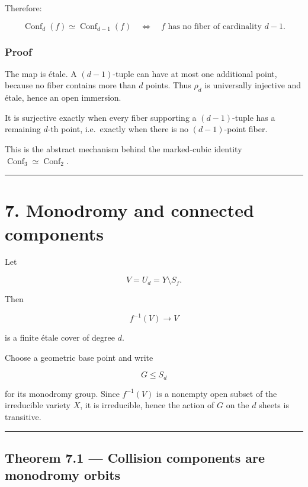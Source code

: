 Therefore:

\[
\boxed{
\operatorname{Conf}_d(f)\simeq \operatorname{Conf}_{d-1}(f)
\quad\Longleftrightarrow\quad
f\text{ has no fiber of cardinality }d-1.
}
\]

\subsubsection{Proof}\label{proof-5}

The map is étale. A \((d-1)\)-tuple can have at most one additional
point, because no fiber contains more than \(d\) points. Thus \(\rho_d\)
is universally injective and étale, hence an open immersion.

It is surjective exactly when every fiber supporting a \((d-1)\)-tuple
has a remaining \(d\)-th point, i.e.~exactly when there is no
\((d-1)\)-point fiber.

This is the abstract mechanism behind the marked-cubic identity
\(\operatorname{Conf}_3\simeq\operatorname{Conf}_2\).

\begin{center}\rule{0.5\linewidth}{0.5pt}\end{center}

\section{7. Monodromy and connected
components}\label{monodromy-and-connected-components}

Let

\[
V=U_d=Y\setminus S_f.
\]

Then

\[
f^{-1}(V)\to V
\]

is a finite étale cover of degree \(d\).

Choose a geometric base point and write

\[
G\le S_d
\]

for its monodromy group. Since \(f^{-1}(V)\) is a nonempty open subset
of the irreducible variety \(X\), it is irreducible, hence the action of
\(G\) on the \(d\) sheets is transitive.

\begin{center}\rule{0.5\linewidth}{0.5pt}\end{center}

\subsection{Theorem 7.1 --- Collision components are monodromy
orbits}\label{theorem-7.1-collision-components-are-monodromy-orbits}

